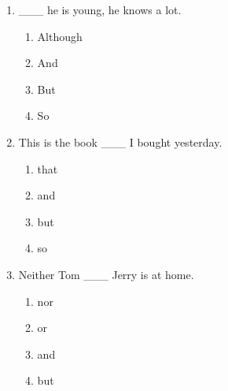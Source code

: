 \documentclass[11pt,a4paper]{ctexart}
\begin{document}
\begin{enumerate}[leftmargin=*,itemsep=4pt]
\begin{enumerate}[label=\Alph*.,leftmargin=2em,itemsep=1pt,topsep=2pt]
\item because
\end{enumerate}
\item \_\_\_ he is young, he knows a lot.
\begin{enumerate}[label=\Alph*.,leftmargin=2em,itemsep=1pt,topsep=2pt]
\item Although
\item And
\item But
\item So
\end{enumerate}
\item This is the book \_\_\_ I bought yesterday.
\begin{enumerate}[label=\Alph*.,leftmargin=2em,itemsep=1pt,topsep=2pt]
\item that
\item and
\item but
\item so
\end{enumerate}
\item Neither Tom \_\_\_ Jerry is at home.
\begin{enumerate}[label=\Alph*.,leftmargin=2em,itemsep=1pt,topsep=2pt]
\item nor
\item or
\item and
\item but
\end{enumerate}
\end{enumerate}

\newpage
\end{document}

